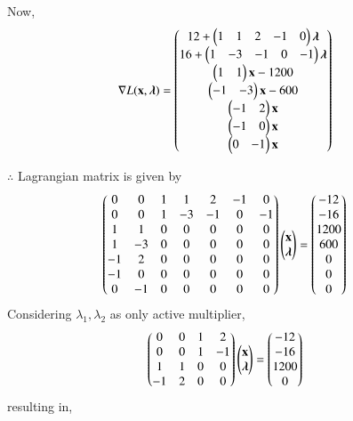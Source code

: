 \documentclass[journal,12pt,twocolumn]{IEEEtran}
\begin{document}
Now,
\begin{align}
    \nabla L(\mathbf{x},\boldsymbol{\lambda}) &= \begin{pmatrix}12+ \begin{pmatrix}1 & 1 & 2 & -1 & 0 \end{pmatrix}\boldsymbol{\lambda}\\ 16+\begin{pmatrix}1 & -3 & -1 & 0 & -1\end{pmatrix}\boldsymbol{\lambda} \\ \begin{pmatrix}1 & 1\end{pmatrix}\mathbf{x}-1200 \\ \begin{pmatrix}-1 & -3\end{pmatrix}\mathbf{x}-600 \\ \begin{pmatrix}-1 & 2\end{pmatrix}\mathbf{x}\\ \begin{pmatrix}-1 & 0\end{pmatrix}\mathbf{x} \\ \begin{pmatrix}0 & -1\end{pmatrix}\mathbf{x}\end{pmatrix}
\end{align}

$\therefore$ Lagrangian matrix is given by
\begin{align}
    \begin{pmatrix}0 & 0 & 1 & 1 & 2 & -1 & 0 \\ 0 & 0 & 1 & -3 & -1 & 0 & -1 \\ 1 & 1 & 0 & 0 & 0 & 0 & 0 \\ 1 & -3 & 0 & 0 & 0 & 0 & 0 \\ -1 & 2 & 0 & 0 & 0 & 0 & 0 \\ -1 & 0 & 0 & 0 & 0 & 0 & 0 \\ 0 & -1 & 0 & 0 & 0 & 0 & 0 \end{pmatrix}\begin{pmatrix}\mathbf{x} \\ \boldsymbol{\lambda} \end{pmatrix} &= \begin{pmatrix}-12 \\ -16 \\ 1200 \\ 600 \\ 0 \\ 0 \\0 \end{pmatrix}
\end{align}
Considering $\lambda_1,\lambda_2$ as only active multiplier,
\begin{align}
    \begin{pmatrix}0 & 0 & 1 & 2 \\ 0 & 0 & 1 & -1 \\ 1 & 1 & 0 & 0 \\ -1 & 2 & 0 & 0\end{pmatrix}\begin{pmatrix}\mathbf{x}\\ \boldsymbol{\lambda}\end{pmatrix} &= \begin{pmatrix}-12 \\ -16 \\ 1200 \\ 0\end{pmatrix}
\end{align}
resulting in,
\end{document}
